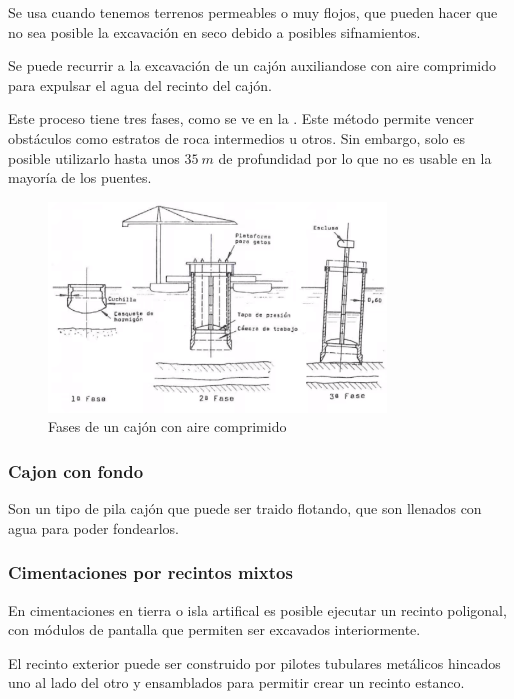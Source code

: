 \documentclass[../main.tex]{subfiles}
\begin{document}
Se usa cuando tenemos terrenos permeables o muy flojos, que pueden hacer que no 
sea posible la excavación en seco debido a posibles sifnamientos. 

Se puede recurrir a la excavación de un cajón auxiliandose con aire comprimido
para expulsar el agua del recinto del cajón.

Este proceso tiene tres fases, como se ve en la . Este método
permite vencer obstáculos como estratos de roca intermedios u otros. Sin embargo,
solo es posible utilizarlo hasta unos $\SI{35}{m}$ de profundidad por lo que no 
es usable en la mayoría de los puentes.

\begin{figure}[ht]
  \centering
  \includegraphics[width=0.8\textwidth]{../images/20210419/cajon-aire}
  \caption{Fases de un cajón con aire comprimido}
  \label{fig:cajon-aire}
\end{figure}

\subsubsection{Cajon con fondo}

Son un tipo de pila cajón que puede ser traido flotando, que son llenados con agua
para poder fondearlos.

\subsubsection{Cimentaciones por recintos mixtos}

En cimentaciones en tierra o isla artifical es posible ejecutar un recinto
poligonal, con módulos de pantalla que permiten ser excavados interiormente. 

El recinto exterior puede ser construido por pilotes tubulares metálicos hincados 
uno al lado del otro y ensamblados para permitir crear un recinto estanco.
\end{document}

